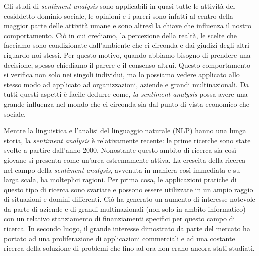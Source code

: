 \documentclass[a4paper,12pt,openright,twoside]{report}
\theoremstyle{definition}
\begin{document}
Gli studi di \emph{sentiment analysis} sono applicabili in quasi tutte
le attività del cosiddetto dominio sociale, le opinioni e i pareri 
sono infatti al centro della maggior parte delle attività umane e sono 
altresì la chiave che influenza il nostro comportamento.
Ciò in cui crediamo, la percezione della realtà, le scelte che facciamo
sono condizionate dall’ambiente che ci circonda e dai giudizi 
degli altri riguardo noi stessi.
Per questo motivo, quando abbiamo bisogno
di prendere una decisione, spesso chiediamo il parere e il consenso altrui.
Questo comportamento si verifica non solo 
nei singoli individui, ma lo possiamo  vedere applicato allo stesso modo ad
applicato ad organizzazioni, aziende e grandi multinazionali.
Da tutti questi aspetti è facile dedurre 
come, \emph{la sentiment analysis} possa avere una grande influenza nel mondo che 
ci circonda sia dal punto di vista economico che sociale.

Mentre la linguistica e l'analisi del linguaggio naturale (NLP) hanno una lunga
storia, la \emph{sentiment analysis} è relativamente recente: le prime ricerche
sono state svolte a partire dall'anno 2000. Nonostante questo ambito di ricerca sia così giovane 
si presenta come un'area estremamente attiva.
La crescita della ricerca nel campo della \emph{sentiment analysis}, avvenuta in maniera così immediata e su larga scala, 
ha molteplici ragioni. 
Per prima cosa, le applicazioni pratiche 
di questo tipo di ricerca sono svariate e possono essere utilizzate in un ampio raggio di 
situazioni e domini differenti. Ciò ha generato un aumento di interesse notevole da parte di
aziende e di grandi multinazionali (non solo in ambito informatico)
con un relativo stanziamento di finanziamenti specifici per questo campo di ricerca.
In secondo luogo, il grande interesse dimostrato da parte del mercato ha portato ad una proliferazione di 
applicazioni commerciali e ad una costante ricerca della soluzione di problemi
che fino ad ora non erano ancora stati studiati.
\end{document}
